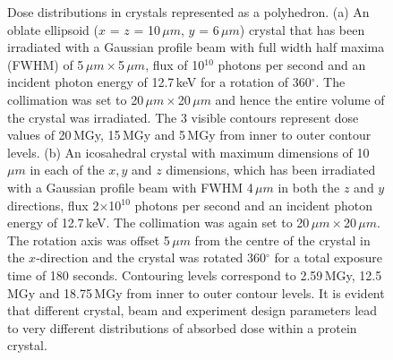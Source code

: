 \begin{figure}
\begin{subfigure}[b]{0.437\textwidth}
                    \caption{}
                    \label{fig:Icosohedral crystal}
            \end{subfigure}
            \caption{Dose distributions in crystals represented as a polyhedron.
            (a) An oblate ellipsoid ($x$ = $z$ = 10\,$\mu m$, $y$ = 6\,$\mu m$) crystal that has been irradiated with a Gaussian profile beam with full width half maxima (FWHM) of 5\,$\mu m \times $5\,$\mu m$, flux of 10$^{\text{10}}$ photons per second and an incident photon energy of 12.7\,keV for a rotation of 360$^{\circ}$.
            The collimation was set to 20\,$\mu m \times $20\,$\mu m$ and hence the entire volume of the crystal was irradiated.
            The 3 visible contours represent dose values of 20\,MGy, 15\,MGy and 5\,MGy from inner to outer contour levels.
            (b) An icosahedral crystal with maximum dimensions of 10\,$\mu m$ in each of the $x, y$ and $z$ dimensions, which has been irradiated with a Gaussian profile beam with FWHM 4\,$\mu m$ in both the $z$ and $y$ directions, flux 2$ \times $10$^{\text{10}}$ photons per second and an incident photon energy of 12.7\,keV.
            The collimation was again set to 20\,$\mu m \times $20\,$\mu m$.
            The rotation axis was offset 5\,$\mu m$ from the centre of the crystal in the $x$-direction and the crystal was rotated 360$^{\circ}$ for a total exposure time of 180 seconds.
            Contouring levels correspond to 2.59\,MGy, 12.5\,MGy and 18.75\,MGy from inner to outer contour levels.
            It is evident that different crystal, beam and experiment design parameters lead to very different distributions of absorbed dose within a protein crystal.}
            \label{fig:RADDOSE-3D Polyhedral Crystal Examples}
        \end{figure}

